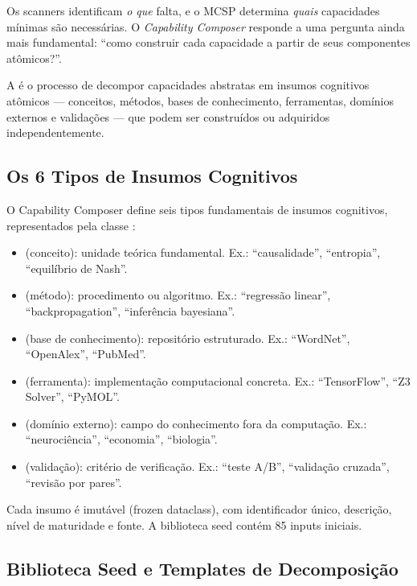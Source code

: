 Os scanners identificam \emph{o que} falta, e o MCSP determina \emph{quais}
capacidades mínimas são necessárias. O \emph{Capability Composer} responde a
uma pergunta ainda mais fundamental: ``como construir cada capacidade a
partir de seus componentes atômicos?''.

\begin{definicao}
A  é o processo de decompor capacidades
abstratas em insumos cognitivos atômicos --- conceitos, métodos, bases
de conhecimento, ferramentas, domínios externos e validações --- que
podem ser construídos ou adquiridos independentemente.
\end{definicao}

\subsection{Os 6 Tipos de Insumos Cognitivos}

O Capability Composer define seis tipos fundamentais de insumos
cognitivos, representados pela classe :

\begin{itemize}
\item {} (conceito): unidade teórica fundamental. Ex.:
``causalidade'', ``entropia'', ``equilíbrio de Nash''.
\item {} (método): procedimento ou algoritmo. Ex.:
``regressão linear'', ``backpropagation'', ``inferência bayesiana''.
\item {} (base de conhecimento): repositório
estruturado. Ex.: ``WordNet'', ``OpenAlex'', ``PubMed''.
\item {} (ferramenta): implementação computacional concreta.
Ex.: ``TensorFlow'', ``Z3 Solver'', ``PyMOL''.
\item {} (domínio externo): campo do conhecimento
fora da computação. Ex.: ``neurociência'', ``economia'', ``biologia''.
\item {} (validação): critério de verificação.
Ex.: ``teste A/B'', ``validação cruzada'', ``revisão por pares''.
\end{itemize}

Cada insumo é imutável (frozen dataclass), com identificador único,
descrição, nível de maturidade e fonte. A biblioteca seed contém 85 inputs
iniciais.

\subsection{Biblioteca Seed e Templates de Decomposição}

